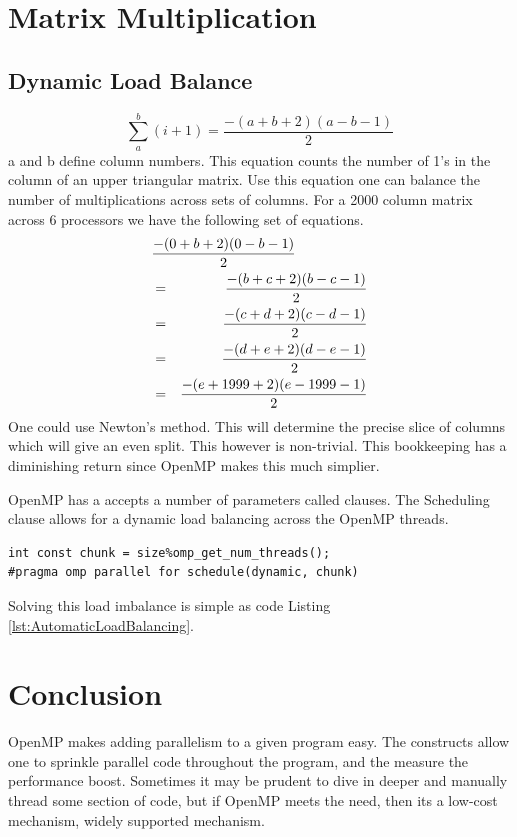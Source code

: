 \documentclass[journal,10pt,onecolumn,draftcls]{IEEEtran}
\begin{document}
\section{Matrix Multiplication}

\subsection{Dynamic Load Balance}

\begin{equation}
\sum\limits_{a}^b (i + 1) = \frac{-(a + b + 2)(a - b -1)}{2}
\end{equation}
a and b define column numbers.  This equation counts the number of 1's in the 
column of an upper triangular matrix. Use this equation one can balance the number of 
multiplications across sets of columns.  For a 2000 column matrix across 6 processors 
we have the following set of equations.
\begin{eqnarray}
\lefteqn{\frac{-(0 + b + 2)(0 - b -1)}{2}} \\
& = & \frac{-(b + c + 2)(b - c -1)}{2} \\
& = & \frac{-(c + d + 2)(c - d -1)}{2} \\
& = & \frac{-(d + e + 2)(d - e -1)}{2} \\
& = & \frac{-(e + 1999 + 2)(e - 1999 -1)}{2}
\end{eqnarray}
One could use Newton's method. This will determine the precise slice of columns which 
will give an even split. This however is non-trivial. This bookkeeping has a diminishing 
return since OpenMP makes this much simplier.

OpenMP has a accepts a number of parameters called clauses. The Scheduling clause allows
for a dynamic load balancing across the OpenMP threads. 

\label{lst:AutomaticLoadBalancing}
\begin{lstlisting}
int const chunk = size%omp_get_num_threads();
#pragma omp parallel for schedule(dynamic, chunk)
\end{lstlisting}
Solving this load imbalance is simple as code Listing \ref{lst:AutomaticLoadBalancing}.


\section{Conclusion}
OpenMP makes adding parallelism to a given program easy. The constructs allow one to sprinkle
parallel code throughout the program, and the measure the performance boost. Sometimes it
may be prudent to dive in deeper and manually thread some section of code, but if OpenMP
meets the need, then its a low-cost mechanism, widely supported mechanism.
\end{document}
